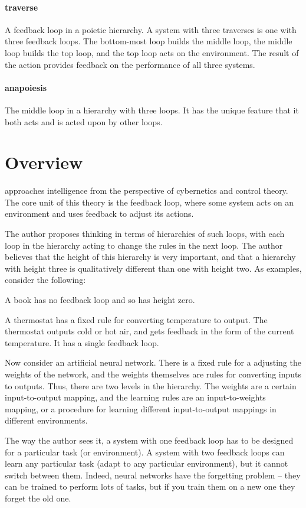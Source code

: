 \documentclass[10pt,a4paper]{article}
\begin{document}
\paragraph{traverse} A feedback loop in a poietic hierarchy. A system with three traverses is one with three feedback loops. The bottom-most loop builds the middle loop, the middle loop builds the top loop, and the top loop acts on the environment. The result of the action provides feedback on the performance of all three systems.

\paragraph{anapoiesis} The middle loop in a hierarchy with three loops. It has the unique feature that it both acts and is acted upon by other loops.

\section{Overview}
\cite{practopoiesis} approaches intelligence from the perspective of cybernetics and control theory. The core unit of this theory is the feedback loop, where some system acts on an environment and uses feedback to adjust its actions.

The author proposes thinking in terms of hierarchies of such loops, with each loop in the hierarchy acting to change the rules in the next loop. The author believes that the height of this hierarchy is very important, and that a hierarchy with height three is qualitatively different than one with height two. As examples, consider the following:

A book has no feedback loop and so has height zero.

A thermostat has a fixed rule for converting temperature to output. The thermostat outputs cold or hot air, and gets feedback in the form of the current temperature. It has a single feedback loop.

Now consider an artificial neural network. There is a fixed rule for a adjusting the weights of the network, and the weights themselves are rules for converting inputs to outputs. Thus, there are two levels in the hierarchy. The weights are a certain input-to-output mapping, and the learning rules are an input-to-weights mapping, or a procedure for learning different input-to-output mappings in different environments.

The way the author sees it, a system with one feedback loop has to be designed for a particular task (or environment). A system with two feedback loops can learn any particular task (adapt to any particular environment), but it cannot switch between them. Indeed, neural networks have the forgetting problem -- they can be trained to perform lots of tasks, but if you train them on a new one they forget the old one.
\end{document}
